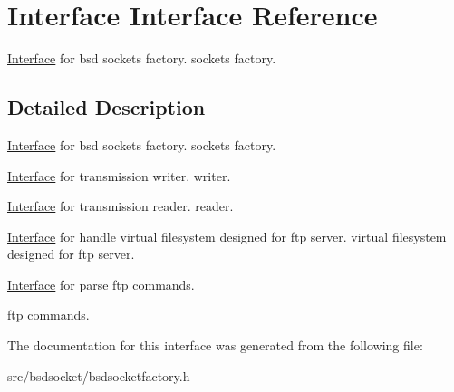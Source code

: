 \hypertarget{interfaceInterface}{}\section{Interface Interface Reference}
\label{interfaceInterface}


\hyperlink{interfaceInterface}{Interface} for bsd sockets factory. sockets factory.  




\subsection{Detailed Description}
\hyperlink{interfaceInterface}{Interface} for bsd sockets factory. sockets factory. 

\hyperlink{interfaceInterface}{Interface} for transmission writer. writer.

\hyperlink{interfaceInterface}{Interface} for transmission reader. reader.

\hyperlink{interfaceInterface}{Interface} for handle virtual filesystem designed for ftp server. virtual filesystem designed for ftp server.

\hyperlink{interfaceInterface}{Interface} for parse ftp commands.

ftp commands. 

The documentation for this interface was generated from the following file\+:\begin{DoxyCompactItemize}
\item 
src/bsdsocket/bsdsocketfactory.\+h\end{DoxyCompactItemize}
